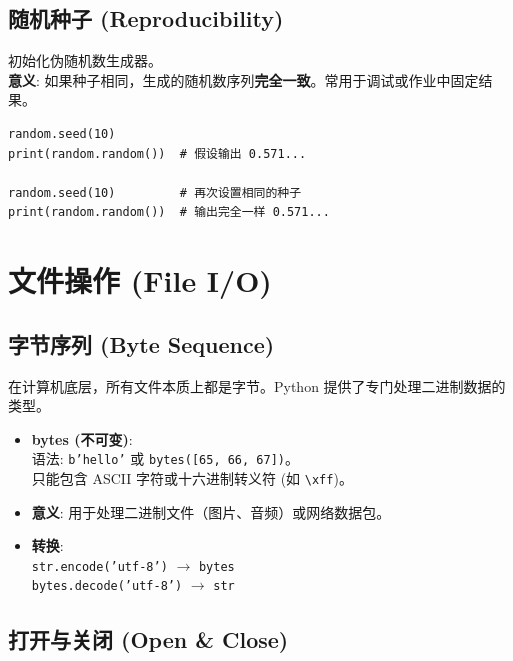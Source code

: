 \documentclass[12pt, a4paper]{article}
\begin{document}
\subsection{随机种子 (Reproducibility)}

\begin{description}[style=multiline, leftmargin=4cm]
    \item[.seed(a=None)] 
    初始化伪随机数生成器。
    \\ \textbf{意义}: 如果种子相同，生成的随机数序列\textbf{完全一致}。常用于调试或作业中固定结果。
\end{description}

\begin{lstlisting}[caption={Seed 的效果}]
random.seed(10)
print(random.random())  # 假设输出 0.571...

random.seed(10)         # 再次设置相同的种子
print(random.random())  # 输出完全一样 0.571...
\end{lstlisting}

\section{文件操作 (File I/O)}

\subsection{字节序列 (Byte Sequence)}

在计算机底层，所有文件本质上都是字节。Python 提供了专门处理二进制数据的类型。

\begin{itemize}
    \item \textbf{bytes (不可变)}: 
    \\ 语法: \texttt{b'hello'} 或 \texttt{bytes([65, 66, 67])}。
    \\ 只能包含 ASCII 字符或十六进制转义符 (如 \texttt{\textbackslash xff})。
    \item \textbf{意义}: 用于处理二进制文件（图片、音频）或网络数据包。
    \item \textbf{转换}:
    \\ \texttt{str.encode('utf-8')} $\to$ \texttt{bytes}
    \\ \texttt{bytes.decode('utf-8')} $\to$ \texttt{str}
\end{itemize}

\subsection{打开与关闭 (Open \& Close)}
\end{document}
